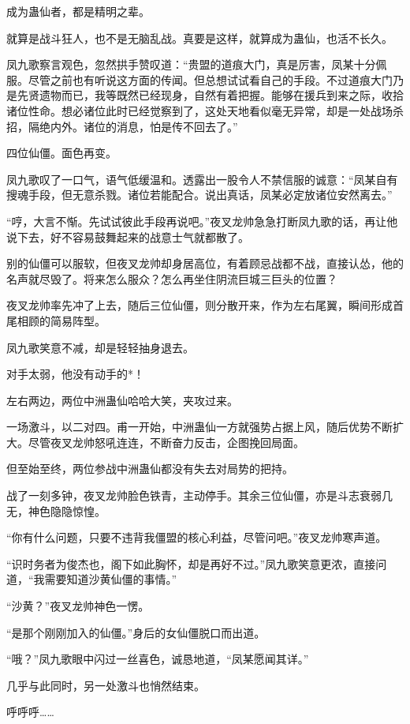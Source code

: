 \begin{this_body}
成为蛊仙者，都是精明之辈。

就算是战斗狂人，也不是无脑乱战。真要是这样，就算成为蛊仙，也活不长久。

凤九歌察言观色，忽然拱手赞叹道：“贵盟的道痕大门，真是厉害，凤某十分佩服。尽管之前也有听说这方面的传闻。但总想试试看自己的手段。不过道痕大门乃是先贤遗物而已，我等既然已经现身，自然有着把握。能够在援兵到来之际，收拾诸位性命。想必诸位此时已经觉察到了，这处天地看似毫无异常，却是一处战场杀招，隔绝内外。诸位的消息，怕是传不回去了。”

四位仙僵。面色再变。

凤九歌叹了一口气，语气低缓温和。透露出一股令人不禁信服的诚意：“凤某自有搜魂手段，但无意杀戮。诸位若能配合。说出真话，凤某必定放诸位安然离去。”

“哼，大言不惭。先试试彼此手段再说吧。”夜叉龙帅急急打断凤九歌的话，再让他说下去，好不容易鼓舞起来的战意士气就都散了。

别的仙僵可以服软，但夜叉龙帅却身居高位，有着顾忌战都不战，直接认怂，他的名声就尽毁了。将来怎么服众？怎么再坐住阴流巨城三巨头的位置？

夜叉龙帅率先冲了上去，随后三位仙僵，则分散开来，作为左右尾翼，瞬间形成首尾相顾的简易阵型。

凤九歌笑意不减，却是轻轻抽身退去。

对手太弱，他没有动手的*！

左右两边，两位中洲蛊仙哈哈大笑，夹攻过来。

一场激斗，以二对四。甫一开始，中洲蛊仙一方就强势占据上风，随后优势不断扩大。尽管夜叉龙帅怒吼连连，不断奋力反击，企图挽回局面。

但至始至终，两位参战中洲蛊仙都没有失去对局势的把持。

战了一刻多钟，夜叉龙帅脸色铁青，主动停手。其余三位仙僵，亦是斗志衰弱几无，神色隐隐惊惶。

“你有什么问题，只要不违背我僵盟的核心利益，尽管问吧。”夜叉龙帅寒声道。

“识时务者为俊杰也，阁下如此胸怀，却是再好不过。”凤九歌笑意更浓，直接问道，“我需要知道沙黄仙僵的事情。”

“沙黄？”夜叉龙帅神色一愣。

“是那个刚刚加入的仙僵。”身后的女仙僵脱口而出道。

“哦？”凤九歌眼中闪过一丝喜色，诚恳地道，“凤某愿闻其详。”

几乎与此同时，另一处激斗也悄然结束。

呼呼呼……


\end{this_body}
